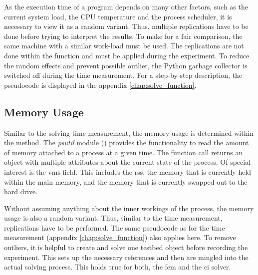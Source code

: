 \documentclass[./\jobname.tex]{subfiles}
\begin{document}
As the execution time of a program depends on many other factors, such as the current system load, the CPU temperature and the process scheduler, it is necessary to view it as a random variant. Thus, multiple replications have to be done before trying to interpret the results. To make for a fair comparison, the same machine with a similar work-load must be used.  The replications are not done within the  function and must be applied during the experiment. To reduce the random effects and prevent possible outlier, the Python garbage collector is switched off during the time measurement. For a step-by-step description, the pseudocode is displayed in the appendix \ref{chap:solve_function}. 



\subsection{Memory Usage}
\label{chap:metric_mem}
Similar to the solving time measurement, the memory usage is determined within the  method. The \textit{psutil} module (\cite{rodola_psutil_2020}) provides the functionality to read the amount of memory attached to a process at a given time. The function call  returns an object with multiple attributes about the current state of the process. Of special interest is the \gls{vms} field. This includes the \gls{rss}, the memory that is currently held within the main memory, and the memory that is currently swapped out to the hard drive.

Without assuming anything about the inner workings of the process, the memory usage is also a random variant. Thus, similar to the time measurement, replications have to be performed. The same pseudocode as for the time measurement (appendix \ref{chap:solve_function}) also applies here. To remove outliers, it is helpful to create and solve one testbed object before recording the experiment. This sets up the necessary references and then are mingled into the actual solving process. This holds true for both, the \gls{fem} and the \gls{ci} solver.  
\end{document}
